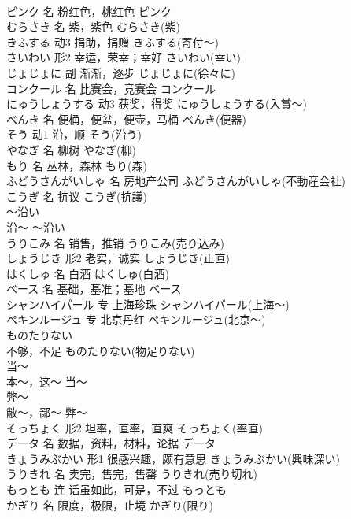 \documentclass[8pt]{extreport}
\begin{document}
\begin{CJK}{UTF8}{min}
\\	ピンク	名	粉红色，桃红色	ピンク	
\\	むらさき	名	紫，紫色	むらさき(紫)	
\\	きふする	动3	捐助，捐赠	きふする(寄付～)	
\\	さいわい	形2	幸运，荣幸；幸好	さいわい(幸い)	
\\	じょじょに	副	渐渐，逐步	じょじょに(徐々に)	
\\	コンクール	名	比赛会，竞赛会	コンクール	
\\	にゅうしょうする	动3	获奖，得奖	にゅうしょうする(入賞～)	
\\	べんき	名	便桶，便盆，便壶，马桶	べんき(便器)	
\\	そう	动1	沿，顺	そう(沿う)	
\\	やなぎ	名	柳树	やなぎ(柳)	
\\	もり	名	丛林，森林	もり(森)	
\\	ふどうさんがいしゃ	名	房地产公司	ふどうさんがいしゃ(不動産会社)	
\\	こうぎ	名	抗议	こうぎ(抗議)	
\\	～沿い	
\\	沿～	～沿い	
\\	うりこみ	名	销售，推销	うりこみ(売り込み)	
\\	しょうじき	形2	老实，诚实	しょうじき(正直)	
\\	はくしゅ	名	白酒	はくしゅ(白酒)	
\\	ベース	名	基础，基准；基地	ベース	
\\	シャンハイパール	专	上海珍珠	シャンハイパール(上海～)	
\\	ペキンルージュ	专	北京丹红	ペキンルージュ(北京～)	
\\	ものたりない	
\\	不够，不足	ものたりない(物足りない)	
\\	当～	
\\	本～，这～	当～	
\\	弊～	
\\	敝～，鄙～	弊～	
\\	そっちょく	形2	坦率，直率，直爽	そっちょく(率直)	
\\	データ	名	数据，资料，材料，论据	データ	
\\	きょうみぶかい	形1	很感兴趣，颇有意思	きょうみぶかい(興味深い)	
\\	うりきれ	名	卖完，售完，售罄	うりきれ(売り切れ)	
\\	もっとも	连	话虽如此，可是，不过	もっとも	
\\	かぎり	名	限度，极限，止境	かぎり(限り)	

\end{CJK}
\end{document}
